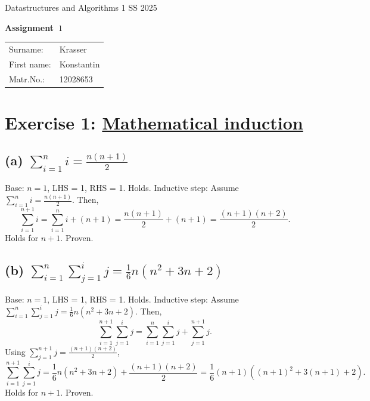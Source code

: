 \documentclass[9pt]{article}
\def\surname{Krasser}
\def\firstname{Konstantin}
\def\matriculationnumber{12028653}
\begin{document}
{\sc Datastructures and Algorithms 1 \hfill SS 2025}\\[.1cm]


\begin{center}
	{\Large\bf
		Assignment~$1$}\\

\end{center}

{\bf
\vspace{1ex}
\hspace{-1ex}\begin{tabular}{ll}
	Surname:    & \surname             \\
	First name: & \firstname           \\
	Matr.No.:   & \matriculationnumber \\
\end{tabular}
}


\section*{Exercise 1: \href{https://www.youtube.com/watch?v=dMn5w4_ztSw}{Mathematical induction}}
\subsection*{(a) \( \sum_{i=1}^{n} i = \frac{n(n+1)}{2} \)}
Base: \( n=1 \), LHS = 1, RHS = 1. Holds. \newline
Inductive step: Assume \( \sum_{i=1}^{n} i = \frac{n(n+1)}{2} \). Then,
\[ \sum_{i=1}^{n+1} i = \sum_{i=1}^{n} i + (n+1) = \frac{n(n+1)}{2} + (n+1) = \frac{(n+1)(n+2)}{2}. \]
Holds for \( n+1 \). Proven.

\subsection*{(b) \( \sum_{i=1}^{n} \sum_{j=1}^{i} j = \frac{1}{6} n(n^2+3n+2) \)}
Base: \( n=1 \), LHS = 1, RHS = 1. Holds. \newline
Inductive step: Assume \( \sum_{i=1}^{n} \sum_{j=1}^{i} j = \frac{1}{6} n(n^2+3n+2) \). Then,
\[ \sum_{i=1}^{n+1} \sum_{j=1}^{i} j = \sum_{i=1}^{n} \sum_{j=1}^{i} j + \sum_{j=1}^{n+1} j. \]
Using \( \sum_{j=1}^{n+1} j = \frac{(n+1)(n+2)}{2} \),
\[ \sum_{i=1}^{n+1} \sum_{j=1}^{i} j = \frac{1}{6} n(n^2+3n+2) + \frac{(n+1)(n+2)}{2} = \frac{1}{6} (n+1)((n+1)^2+3(n+1)+2). \]
Holds for \( n+1 \). Proven.
\end{document}
